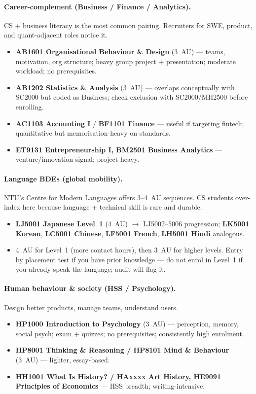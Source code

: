 \paragraph{Career-complement (Business / Finance / Analytics).}
CS + business literacy is the most common pairing. Recruiters for SWE, product, and quant-adjacent roles notice it.
\begin{itemize}
    \item \textbf{AB1601 Organisational Behaviour \& Design} (3~AU) --- teams, motivation, org structure; heavy group project + presentation; moderate workload; no prerequisites.
    \item \textbf{AB1202 Statistics \& Analysis} (3~AU) --- overlaps conceptually with SC2000 but coded as Business; check exclusion with SC2000/MH2500 before enrolling.
    \item \textbf{AC1103 Accounting I} / \textbf{BF1101 Finance} --- useful if targeting fintech; quantitative but memorisation-heavy on standards.
    \item \textbf{ET9131 Entrepreneurship I, BM2501 Business Analytics} --- venture/innovation signal; project-heavy.
\end{itemize}

\paragraph{Language BDEs (global mobility).}
NTU's Centre for Modern Languages offers 3--4~AU sequences. CS students over-index here because language + technical skill is rare and durable.
\begin{itemize}
    \item \textbf{LJ5001 Japanese Level~1} (4~AU) $\to$ LJ5002--5006 progression; \textbf{LK5001 Korean}, \textbf{LC5001 Chinese}, \textbf{LF5001 French}, \textbf{LH5001 Hindi} analogous.
    \item 4~AU for Level~1 (more contact hours), then 3~AU for higher levels. Entry by placement test if you have prior knowledge --- do not enrol in Level~1 if you already speak the language; audit will flag it.
\end{itemize}

\paragraph{Human behaviour \& society (HSS / Psychology).}
Design better products, manage teams, understand users.
\begin{itemize}
    \item \textbf{HP1000 Introduction to Psychology} (3~AU) --- perception, memory, social psych; exam + quizzes; no prerequisites; consistently high enrolment.
    \item \textbf{HP8001 Thinking \& Reasoning / HP8101 Mind \& Behaviour} (3~AU) --- lighter, essay-based.
    \item \textbf{HH1001 What Is History? / HAxxxx Art History, HE9091 Principles of Economics} --- HSS breadth; writing-intensive.
\end{itemize}

